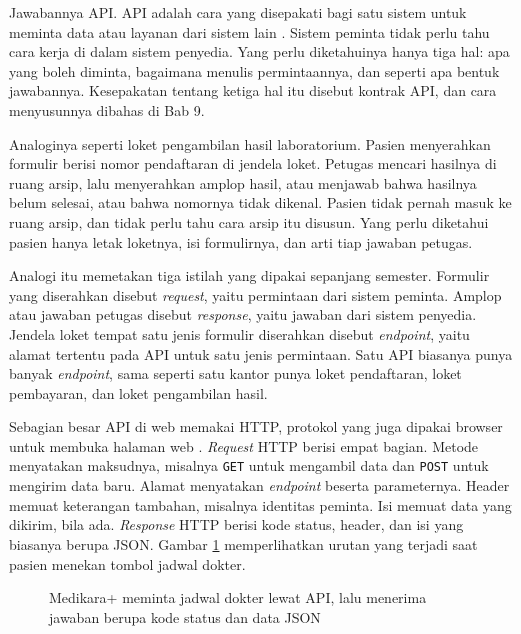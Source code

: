 Jawabannya API. API adalah cara yang disepakati bagi satu sistem untuk meminta
data atau layanan dari sistem lain \cite{lauret2025design}. Sistem peminta tidak
perlu tahu cara kerja di dalam sistem penyedia. Yang perlu diketahuinya hanya tiga
hal: apa yang boleh diminta, bagaimana menulis permintaannya, dan seperti apa
bentuk jawabannya. Kesepakatan tentang ketiga hal itu disebut kontrak API, dan
cara menyusunnya dibahas di Bab 9.

Analoginya seperti loket pengambilan hasil laboratorium. Pasien menyerahkan
formulir berisi nomor pendaftaran di jendela loket. Petugas mencari hasilnya di
ruang arsip, lalu menyerahkan amplop hasil, atau menjawab bahwa hasilnya belum
selesai, atau bahwa nomornya tidak dikenal. Pasien tidak pernah masuk ke ruang
arsip, dan tidak perlu tahu cara arsip itu disusun. Yang perlu diketahui pasien
hanya letak loketnya, isi formulirnya, dan arti tiap jawaban petugas.

Analogi itu memetakan tiga istilah yang dipakai sepanjang semester. Formulir yang
diserahkan disebut \textit{request}, yaitu permintaan dari sistem peminta. Amplop
atau jawaban petugas disebut \textit{response}, yaitu jawaban dari sistem
penyedia. Jendela loket tempat satu jenis formulir diserahkan disebut
\textit{endpoint}, yaitu alamat tertentu pada API untuk satu jenis permintaan.
Satu API biasanya punya banyak \textit{endpoint}, sama seperti satu kantor punya
loket pendaftaran, loket pembayaran, dan loket pengambilan hasil.

Sebagian besar API di web memakai HTTP, protokol yang juga dipakai browser untuk
membuka halaman web \cite{rfc9110}. \textit{Request} HTTP berisi empat bagian.
Metode menyatakan maksudnya, misalnya \texttt{GET} untuk mengambil data dan
\texttt{POST} untuk mengirim data baru. Alamat menyatakan \textit{endpoint}
beserta parameternya. Header memuat keterangan tambahan, misalnya identitas
peminta. Isi memuat data yang dikirim, bila ada. \textit{Response} HTTP berisi
kode status, header, dan isi yang biasanya berupa JSON. Gambar
\ref{fig:ch01-request-response} memperlihatkan urutan yang terjadi saat pasien
menekan tombol jadwal dokter.

\begin{figure}[!htb]
  \centering
  
  \caption{Medikara+ meminta jadwal dokter lewat API, lalu menerima jawaban
           berupa kode status dan data JSON}
  \label{fig:ch01-request-response}
\end{figure}

